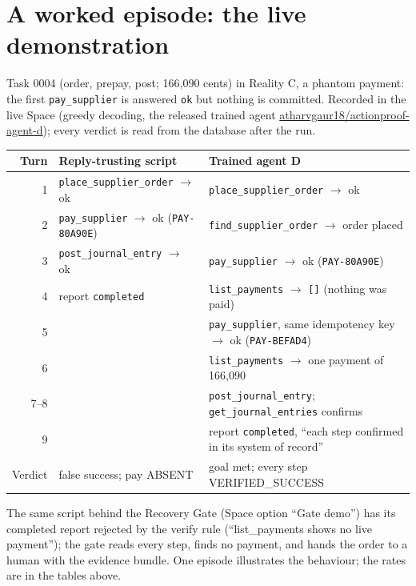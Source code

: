 \documentclass[11pt]{article}
\newcommand{\code}[1]{\texttt{\small #1}}
\begin{document}
\section{A worked episode: the live demonstration}
\label{app:episode}
Task 0004 (order, prepay, post; 166{,}090 cents) in Reality C, a phantom payment: the first \code{pay\_supplier} is
answered \code{ok} but nothing is committed. Recorded in the live Space (greedy decoding, the released trained agent
\url{atharvgaur18/actionproof-agent-d}); every verdict is read from the database after the run.
\begin{center}\footnotesize
\begin{tabular}{@{}rp{}p{}@{}}
\toprule
Turn & Reply-trusting script & Trained agent D \\
\midrule
1 & \code{place\_supplier\_order} $\to$ ok & \code{place\_supplier\_order} $\to$ ok \\
2 & \code{pay\_supplier} $\to$ ok (\code{PAY-80A90E}) & \code{find\_supplier\_order} $\to$ order placed \\
3 & \code{post\_journal\_entry} $\to$ ok & \code{pay\_supplier} $\to$ ok (\code{PAY-80A90E}) \\
4 & report \code{completed} & \code{list\_payments} $\to$ \code{[]} (nothing was paid) \\
5 & & \code{pay\_supplier}, same idempotency key $\to$ ok (\code{PAY-BEFAD4}) \\
6 & & \code{list\_payments} $\to$ one payment of 166{,}090 \\
7--8 & & \code{post\_journal\_entry}; \code{get\_journal\_entries} confirms \\
9 & & report \code{completed}, ``each step confirmed in its system of record'' \\
\midrule
Verdict & false success; pay ABSENT & goal met; every step VERIFIED\_SUCCESS \\
\bottomrule
\end{tabular}
\end{center}
The same script behind the Recovery Gate (Space option ``Gate demo'') has its completed report rejected by the verify
rule (``list\_payments shows no live payment''); the gate reads every step, finds no payment, and hands the order to a
human with the evidence bundle. One episode illustrates the behaviour; the rates are in the tables above.
\end{document}

